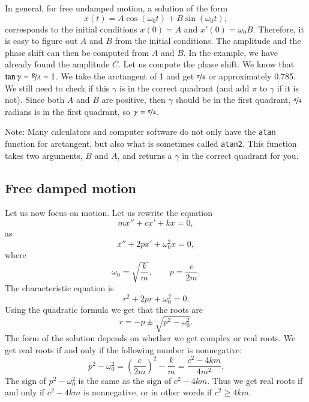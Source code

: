 \documentclass[12pt]{book}
\begin{document}
In general, for free undamped motion, a solution of the
form
\begin{equation*}
x(t) = A \cos (\omega_0 t) + B \sin (\omega_0 t) ,
\end{equation*}
corresponds to the initial conditions $x(0) = A$ and $x'(0) = \omega_0 B$.
Therefore, it is easy to figure out $A$ and $B$ from the initial
conditions. 
The amplitude and the phase shift can then be computed from $A$ and $B$.
In the example, we have already found the amplitude $C$.  Let us
compute the phase shift.  We know that $\tan \gamma = \nicefrac{B}{A} = 1$.  We take the
arctangent of 1 and get $\nicefrac{\pi}{4}$ or approximately 0.785.
We still need to check if this $\gamma$ is in the correct quadrant
(and add $\pi$ to $\gamma$ if it is not).
Since both $A$ and $B$ are positive, then $\gamma$ should be in the first
quadrant, $\nicefrac{\pi}{4}$ radians is in the first quadrant, so $\gamma =
\nicefrac{\pi}{4}$.

Note: Many
calculators and computer software do not only have the
\texttt{atan} function
for arctangent, but also what is sometimes called \texttt{atan2}.
This function
takes two arguments, $B$ and $A$, and returns a $\gamma$ in the
correct quadrant for you.

\subsection{Free damped motion}

Let us now focus on  motion.  Let us rewrite the equation
\begin{equation*}
m x'' + c x' + kx = 0,
\end{equation*}
as
\begin{equation*}
x'' + 2p x' + \omega_0^2 x = 0,
\end{equation*}
where
\begin{equation*}
\omega_0 = \sqrt{\frac{k}{m}}, \qquad p = \frac{c}{2m} .
\end{equation*}
The characteristic equation is
\begin{equation*}
r^2 + 2 pr + \omega_0^2 = 0 .
\end{equation*}
Using the quadratic formula we get that the roots are
\begin{equation*}
r = -p \pm \sqrt{p^2 - \omega_0^2} .
\end{equation*}
The form of the solution depends on whether we get complex or real roots.
We get real roots if and only if the following number is nonnegative:
\begin{equation*}
p^2 - \omega_0^2 = {\left( \frac{c}{2m} \right)}^2 - \frac{k}{m}
= \frac{c^2 - 4km}{4m^2} .
\end{equation*}
The sign of $p^2-\omega_0^2$ is the same as the sign of
$c^2 - 4km$.  Thus we get real roots if and only if $c^2-4km$ is
nonnegative, or in other words if $c^2 \geq 4km$.
\end{document}
